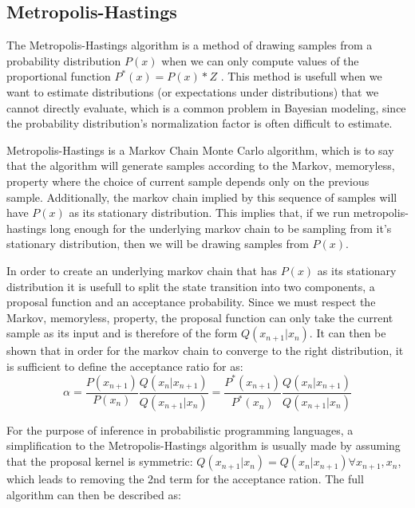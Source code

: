 \subsection{Metropolis-Hastings}
\label{sect:MH}
The Metropolis-Hastings algorithm is a method of drawing samples from a probability distribution $P(x)$ when we can only compute values of the proportional function $P^*(x) = P(x)*Z$ \cite{metropolis1953equation, hastings1970monte}. This method is usefull when we want to estimate distributions (or expectations under distributions) that we cannot directly evaluate, which is a common problem in Bayesian modeling, since the probability distribution's normalization factor is often difficult to estimate.

Metropolis-Hastings is a Markov Chain Monte Carlo algorithm, which is to say that the algorithm will generate samples according to the Markov, memoryless, property where the choice of current sample depends only on the previous sample. Additionally, the markov chain implied by this sequence of samples will have $P(x)$ as its stationary distribution. This implies that, if we run metropolis-hastings long enough for the underlying markov chain to be sampling from it's stationary distribution, then we will be drawing samples from $P(x)$.

In order to create an underlying markov chain that has $P(x)$ as its stationary distribution it is usefull to split the state transition into two components, a proposal function and an acceptance probability. Since we must respect the Markov, memoryless, property, the proposal function can only take the current sample as its input and is therefore of the form $Q(x_{n+1} | x_{n})$. It can then be shown \cite{neal1993probabilistic} that in order for the markov chain to converge to the right distribution, it is sufficient to define the acceptance ratio for as:
\[ \alpha = \frac{P(x_{n+1})}{P(x_{n})}\frac{Q(x_{n} | x_{n+1})}{Q(x_{n+1} | x_{n})} = \frac{P^*(x_{n+1})}{P^*(x_{n})}\frac{Q(x_{n} | x_{n+1})}{Q(x_{n+1} | x_{n})} \]

For the purpose of inference in probabilistic programming languages, a simplification to the Metropolis-Hastings algorithm is usually made by assuming that the proposal kernel is symmetric: $Q(x_{n+1} | x_{n}) = Q(x_{n} | x_{n+1}) \forall x_{n+1}, x_{n}$, which leads to removing the 2nd term for the acceptance ration. The full algorithm can then be described as:

